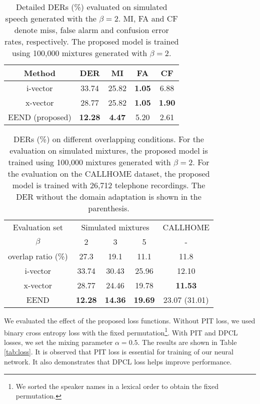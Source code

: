 \documentclass[a4paper]{article}
\begin{document}
\begin{table}[t]
\caption{Detailed DERs (\%) evaluated on simulated speech generated with the $\beta = 2$.  MI, FA and CF denote miss, false alarm and confusion error rates, respectively. The proposed model is trained using 100,000 mixtures generated with $\beta=2$.}
\label{tab:detail}
\centering
\begin{tabular}{ccccc} \hline
Method & DER	& MI & FA & CF \\ \hline
i-vector & 33.74 & 25.82 & {\bf1.05} & 6.88 \\
x-vector &	28.77& 25.82 & {\bf1.05} &	{\bf1.90} \\
EEND (proposed) &	{\bf12.28} &	\bf{4.47}	& 5.20	&  2.61  \\ \hline
\end{tabular}
\end{table}

\begin{table}[t]
\caption{DERs (\%) on different overlapping conditions.
For the evaluation on simulated mixtures, the proposed model is trained using 100,000 mixtures generated with $\beta=2$. For the evaluation on the CALLHOME dataset, the proposed model is trained with 26,712 telephone recordings. The DER without the domain adaptation is shown in the parenthesis.}
\label{tab:overlap}
\centering
\begin{tabular}{c|ccc|c} \hline
Evaluation set & \multicolumn{3}{c|}{Simulated mixtures} & CALLHOME \\
$\beta$ & 2 & 3 & 5 & - \\
overlap ratio (\%) & 27.3 & 19.1 & 11.1 & 11.8 \\ \hline \hline
i-vector & 33.74 & 30.43 & 25.96 & 12.10\\
x-vector &	28.77& 24.46 &	19.78 & \bf{11.53} \\
EEND &	\bf{12.28} & \bf{14.36} & {\bf19.69}  &23.07 (31.01) \\ \hline
\end{tabular}
\end{table}

We evaluated the effect of the proposed loss functions.
Without PIT loss, we used binary cross entropy loss with the fixed permutation\footnote{We sorted the speaker names in a lexical order to obtain the fixed permutation.}. With PIT and DPCL losses, we set the mixing parameter $\alpha = 0.5$.
The results are shown in Table \ref{tab:loss}.
It is observed that PIT loss is essential for training of our neural network. It also demonstrates that DPCL loss helps improve performance.
\end{document}
